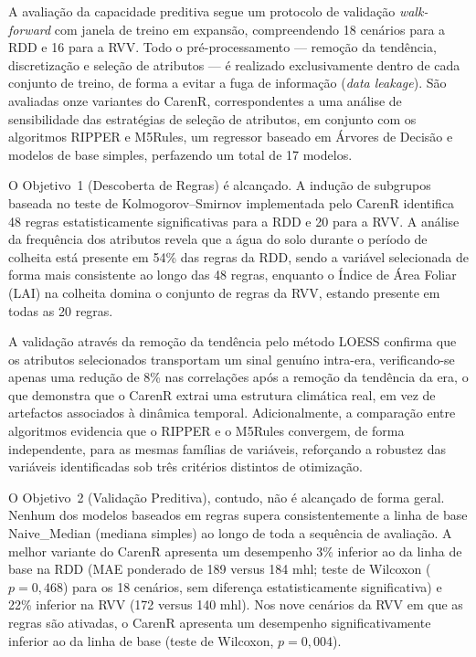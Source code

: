 A avaliação da capacidade preditiva segue um protocolo de validação \textit{walk-forward} com janela de treino em expansão, compreendendo 18 cenários para a RDD e 16 para a RVV. Todo o pré-processamento --- remoção da tendência, discretização e seleção de atributos --- é realizado exclusivamente dentro de cada conjunto de treino, de forma a evitar a fuga de informação (\textit{data leakage}). São avaliadas onze variantes do CarenR, correspondentes a uma análise de sensibilidade das estratégias de seleção de atributos, em conjunto com os algoritmos RIPPER e M5Rules, um regressor baseado em Árvores de Decisão e modelos de base simples, perfazendo um total de 17 modelos.

O Objetivo~1 (Descoberta de Regras) é alcançado. A indução de subgrupos baseada no teste de Kolmogorov--Smirnov implementada pelo CarenR identifica 48 regras estatisticamente significativas para a RDD e 20 para a RVV. A análise da frequência dos atributos revela que a água do solo durante o período de colheita está presente em 54\% das regras da RDD, sendo a variável selecionada de forma mais consistente ao longo das 48 regras, enquanto o Índice de Área Foliar (LAI) na colheita domina o conjunto de regras da RVV, estando presente em todas as 20 regras.

A validação através da remoção da tendência pelo método LOESS confirma que os atributos selecionados transportam um sinal genuíno intra-era, verificando-se apenas uma redução de 8\% nas correlações após a remoção da tendência da era, o que demonstra que o CarenR extrai uma estrutura climática real, em vez de artefactos associados à dinâmica temporal. Adicionalmente, a comparação entre algoritmos evidencia que o RIPPER e o M5Rules convergem, de forma independente, para as mesmas famílias de variáveis, reforçando a robustez das variáveis identificadas sob três critérios distintos de otimização.

O Objetivo~2 (Validação Preditiva), contudo, não é alcançado de forma geral. Nenhum dos modelos baseados em regras supera consistentemente a linha de base Naive\_Median (mediana simples) ao longo de toda a sequência de avaliação. A melhor variante do CarenR apresenta um desempenho 3\% inferior ao da linha de base na RDD (MAE ponderado de 189 versus 184 mhl; teste de Wilcoxon ($p = 0{,}468$) para os 18 cenários, sem diferença estatisticamente significativa) e 22\% inferior na RVV (172 versus 140 mhl). Nos nove cenários da RVV em que as regras são ativadas, o CarenR apresenta um desempenho significativamente inferior ao da linha de base (teste de Wilcoxon, $p = 0{,}004$).

